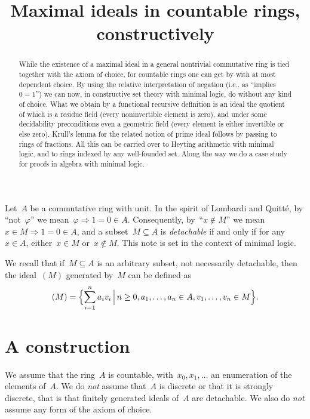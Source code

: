 \documentclass[oneside,reqno]{amsart}
\title{Maximal ideals in countable rings, constructively}
\author{}
\theoremstyle{definition}
\theoremstyle{plain}
\theoremstyle{remark}
\renewcommand{\_}{\mathpunct{.}\,}
\begin{document}
\begin{abstract}
  While the existence of a maximal ideal in a general nontrivial commutative
  ring is tied together with the axiom of choice, for countable rings one can
  get by with at most dependent choice. By using the relative interpretation of
  negation (i.e., as ``implies~$0=1$'') we can now, in constructive set theory with
  minimal logic, do without any kind of choice. What we obtain by a functional
  recursive definition is an ideal the quotient of which is a residue field
  (every noninvertible element is zero), and under some decidability
  preconditions even a geometric field (every element is either invertible or
  else zero). Krull's lemma for the related notion of prime ideal follows by
  passing to rings of fractions. All this can be carried over to Heyting
  arithmetic with minimal logic, and to rings indexed by any well-founded set.
  Along the way we do a case study for proofs in algebra with minimal logic.
\end{abstract}


\maketitle
\thispagestyle{empty}


Let~$A$ be a commutative ring with unit. In the spirit of Lombardi and Quitté,
by ``not~$\varphi$'' we mean~$\varphi \Rightarrow 1 = 0 \in A$. Consequently,
by~``$x \not\in M$'' we mean~$x \in M \Rightarrow 1 = 0 \in A$, and a subset~$M
\subseteq A$ is \emph{detachable} if and only if for any~$x \in A$, either~$x \in M$
or~$x \not\in M$. This note is set in the context of minimal logic.

We recall that if~$M \subseteq A$ is an arbitrary subset, not necessarily
detachable, then the ideal~$(M)$ generated by~$M$ can be defined
as \[ (M) = \Bigl\{ \sum_{i=1}^n a_i v_i \,\Big|\, n \geq 0, a_1,\ldots,a_n \in
A, v_1,\ldots,v_n \in M \Bigr\}. \]


\section{A construction}
\label{sect:constr}

We assume that the ring~$A$ is countable, with~$x_0, x_1, \ldots$ an
enumeration of the elements of~$A$. We do \emph{not} assume that~$A$ is
discrete or that it is strongly discrete, that is that finitely generated
ideals of~$A$ are detachable. We also do
\emph{not} assume any form of the axiom of choice.
\end{document}
